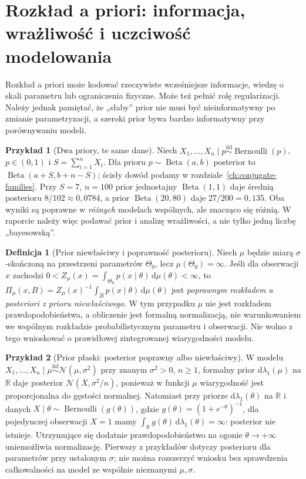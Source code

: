 \documentclass[11pt,a4paper,oneside]{report}
\numberwithin{equation}{chapter}
\theoremstyle{plain}
\theoremstyle{definition}
\newtheorem{definicja}{Definicja}[chapter]
\newtheorem{przyklad}{Przykład}[chapter]
\theoremstyle{remark}
\newcommand{\R}{\mathbb R}
\newcommand{\dd}{\mathrm d}
\newcommand{\iid}{\mathrel{\overset{\mathrm{iid}}\sim}}
\begin{document}
\section{Rozkład a priori: informacja, wrażliwość i uczciwość modelowania}
Rozkład a priori może kodować rzeczywiste wcześniejsze informacje,
wiedzę o skali parametru lub ograniczenia fizyczne. Może też pełnić rolę
regularizacji. Należy jednak pamiętać, że „słaby” prior nie musi być
nieinformatywny po zmianie parametryzacji, a szeroki prior bywa
bardzo informatywny przy porównywaniu modeli.

\begin{przyklad}[Dwa priory, te same dane]
Niech $X_1,\ldots,X_n\mid p\iid\operatorname{Bernoulli}(p)$,
$p\in(0,1)$ i $S=\sum_{i=1}^nX_i$. Dla prioru $p\sim
\operatorname{Beta}(a,b)$ posterior to $\operatorname{Beta}(a+S,b+n-S)$;
ścisły dowód podamy w rozdziale~\ref{ch:conjugate-families}.
Przy $S=7$, $n=100$ prior jednostajny $\operatorname{Beta}(1,1)$
daje średnią posterioru $8/102\approx0{,}0784$, a prior
$\operatorname{Beta}(20,80)$ daje $27/200=0{,}135$.
Oba wyniki są poprawne w \emph{różnych} modelach wspólnych, ale
znacząco się różnią. W raporcie należy więc podawać prior i
analizę wrażliwości, a nie tylko jedną liczbę „bayesowską”.
\end{przyklad}

\begin{definicja}[Prior niewłaściwy i poprawność posterioru]
Niech $\mu$ będzie miarą $\sigma$-skończoną na przestrzeni
parametrów $\Theta_0$, lecz $\mu(\Theta_0)=\infty$.
Jeśli dla obserwacji $x$ zachodzi
$0<Z_\mu(x)=\int_{\Theta_0}p(x\mid\theta)\,\dd\mu(\theta)<\infty$,
to $\Pi_\mu(x,B)=Z_\mu(x)^{-1}\int_B p(x\mid\theta)\,\dd\mu(\theta)$
jest \emph{poprawnym rozkładem a posteriori z prioru niewłaściwego}.
W tym przypadku $\mu$ nie jest rozkładem prawdopodobieństwa,
a obliczenie jest formalną normalizacją, nie warunkowaniem we wspólnym
rozkładzie probabilistycznym parametru i obserwacji. Nie wolno z tego
wnioskować o prawidłowej zintegrowanej wiarygodności modelu.
\end{definicja}

\begin{przyklad}[Prior płaski: posterior poprawny albo niewłaściwy]
W modelu $X_1,\ldots,X_n\mid\mu\iid\mathcal N(\mu,\sigma^2)$
przy znanym $\sigma^2>0$, $n\ge1$, formalny prior
$\dd\lambda_1(\mu)$ na $\R$ daje posterior
$\mathcal N(\overline X,\sigma^2/n)$, ponieważ w funkcji $\mu$
wiarygodność jest proporcjonalna do gęstości normalnej.
Natomiast przy priorze $\dd\lambda_1(\theta)$ na $\R$ i danych
$X\mid\theta\sim\operatorname{Bernoulli}(g(\theta))$, gdzie
$g(\theta)=(1+e^{-\theta})^{-1}$, dla pojedynczej obserwacji
$X=1$ mamy $\int_\R g(\theta)\,\dd\lambda_1(\theta)=\infty$:
posterior nie istnieje. Utrzymujące się dodatnie prawdopodobieństwo
na ogonie $\theta\to+\infty$ uniemożliwia normalizację.
Pierwszy z przykładów dotyczy posterioru dla parametrów przy
ustalonym $\sigma$; nie można rozszerzyć wniosku bez sprawdzenia
całkowalności na model ze wspólnie nieznanymi $\mu,\sigma$.
\end{przyklad}
\end{document}
